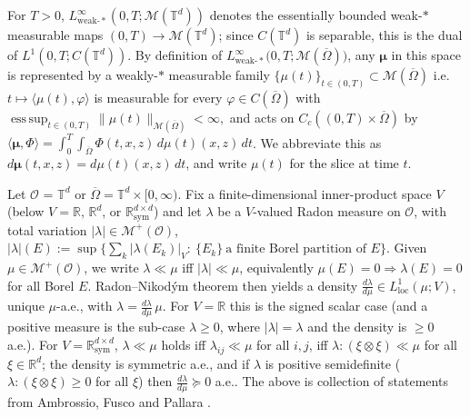 \documentclass[12pt,a4paper,twoside]{article}
\numberwithin{equation}{section}%
\newcommand{\T}{\mathbb{T}}
\begin{document}
For $T>0$, $L^\infty_{\mathrm{weak}\text{-}*}(0,T;\mathcal M(\mathbb T^d))$ denotes the essentially bounded weak-$*$ measurable maps $(0,T)\to\mathcal M(\mathbb T^d)$; since $C(\mathbb T^d)$ is separable, this is the dual of $L^1(0,T;C(\mathbb T^d))$. By definition of $L^\infty_{\mathrm{weak}\text{-}*}\big(0,T;\mathcal M(\overline\Omega)\big)$, any
	$\boldsymbol\mu$ in this space is represented by a weakly-$*$ measurable family
	$\{\mu(t)\}_{t\in(0,T)}\subset\mathcal M(\overline\Omega)$ i.e.\ $t\mapsto\langle\mu(t),\varphi\rangle$
	is measurable for every $\varphi\in C(\overline\Omega)$ with $ \operatorname*{ess\,sup}_{t\in(0,T)}\|\mu(t)\|_{\mathcal M(\overline\Omega)}<\infty ,$ and acts on $C_c((0,T)\times\overline\Omega)$ by $ \langle\boldsymbol\mu,\Phi\rangle=\int_0^T\!\!\int_{\overline\Omega}\Phi(t,x,z)\,d\mu(t)(x,z)\,dt $. We abbreviate this as $d\boldsymbol\mu(t,x,z)=d\mu(t)(x,z)\,dt$, and write $\mu(t)$ for the slice at
	time $t$.\par
Let $\mathcal O$ = $\mathbb T^d$ or $\overline\Omega=\T^d\times [0,\infty)$. Fix a finite-dimensional inner-product space $V$ (below $V=\mathbb R$, $\mathbb
R^{d}$, or $\mathbb R^{d\times d}_{\mathrm{sym}}$) and let $\lambda$ be a
$V$-valued Radon measure on $\mathcal O$, with total variation
$|\lambda|\in\mathcal M^+(\mathcal O)$, $ |\lambda|(E):=\sup\Big\{\textstyle\sum_k|\lambda(E_k)|_V:\ \{E_k\}\ \text{a finite
	Borel partition of }E\Big\}$.
Given $\mu\in\mathcal M^+(\mathcal O)$, we write $\lambda\ll\mu$ iff
$|\lambda|\ll\mu$, equivalently $\mu(E)=0\Rightarrow\lambda(E)=0$ for all Borel
$E$. Radon--Nikod\'ym theorem then yields a density
$\tfrac{d\lambda}{d\mu}\in L^1_{\mathrm{loc}}(\mu;V)$, unique $\mu$-a.e., with
$\lambda=\tfrac{d\lambda}{d\mu}\,\mu$.
For $V=\mathbb R$ this is the signed scalar case (and a
positive measure is the sub-case $\lambda\ge0$, where $|\lambda|=\lambda$ and the
density is $\ge0$ a.e.). For $V=\mathbb R^{d\times d}_{\mathrm{sym}}$,
$\lambda\ll\mu$ holds iff $\lambda_{ij}\ll\mu$ for all $i,j$, iff $\lambda{:}(\xi\otimes\xi)\ll\mu$ for all $\xi\in\mathbb R^d$; the
density is symmetric a.e., and if $\lambda$ is positive semidefinite
($\lambda{:}(\xi\otimes\xi)\ge0$ for all $\xi$) then
$\tfrac{d\lambda}{d\mu}\succeq0$ a.e.. The above is collection of statements from Ambrossio, Fusco  and Pallara \cite[Chapter 1]{AFP2000}.
\end{document}
